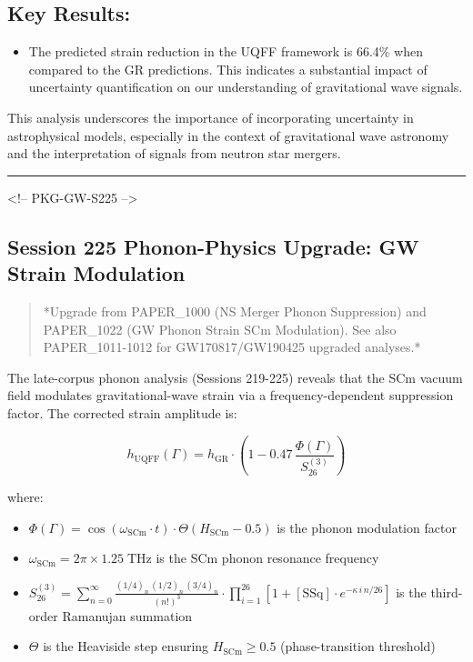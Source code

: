 \documentclass[11pt]{article}
\begin{document}
\subsection*{Key Results:}

\begin{itemize}
  \item The predicted strain reduction in the UQFF framework is 66.4\% when compared to the GR predictions. This indicates a substantial impact of uncertainty quantification on our understanding of gravitational wave signals.
\end{itemize}

This analysis underscores the importance of incorporating uncertainty in astrophysical models, especially in the context of gravitational wave astronomy and the interpretation of signals from neutron star mergers.

\noindent\rule{\textwidth}{0.4pt}

<!-- PKG-GW-S225 -->

\subsection*{Session 225 Phonon-Physics Upgrade: GW Strain Modulation}

\begin{quote}
*Upgrade from PAPER\_1000 (NS Merger Phonon Suppression) and PAPER\_1022
(GW Phonon Strain SCm Modulation). See also PAPER\_1011-1012 for
GW170817/GW190425 upgraded analyses.*
\end{quote}

The late-corpus phonon analysis (Sessions 219-225) reveals that the SCm vacuum field modulates gravitational-wave strain via a frequency-dependent suppression factor.  The corrected strain amplitude is:

$$h_{\text{UQFF}}(\Gamma) = h_{\text{GR}} \cdot \left(1 - 0.47\,\frac{\Phi(\Gamma)}{S_{26}^{(3)}}\right)$$

where:

\begin{itemize}
  \item $\Phi(\Gamma) = \cos(\omega_{\text{SCm}} \cdot t) \cdot \Theta(H_{\text{SCm}} - 0.5)$ is the phonon modulation factor
  \item $\omega_{\text{SCm}} = 2\pi \times 1.25\;\text{THz}$ is the SCm phonon resonance frequency
  \item $S_{26}^{(3)} = \sum_{n=0}^{\infty} \frac{(1/4)_n\,(1/2)_n\,(3/4)_n}{(n!)^3} \cdot \prod_{i=1}^{26}\left[1 + [\text{SSq}]\cdot e^{-\kappa\,i\,n/26}\right]$ is the third-order Ramanujan summation
  \item $\Theta$ is the Heaviside step ensuring $H_{\text{SCm}} \geq 0.5$ (phase-transition threshold)
\end{itemize}
\end{document}

